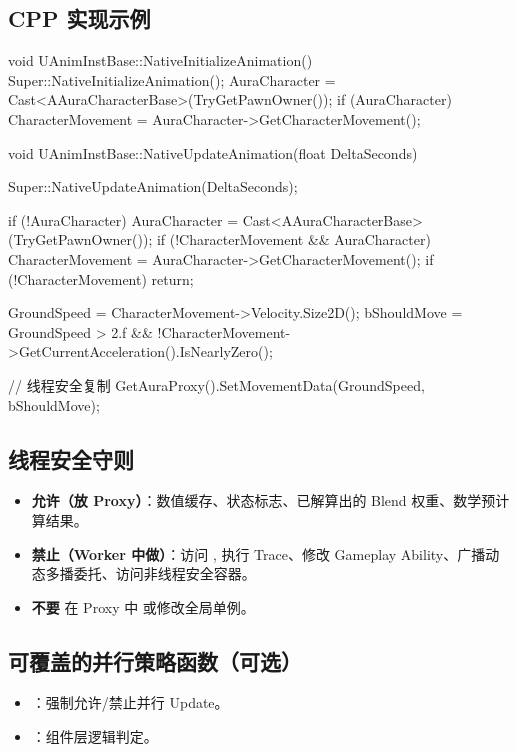 \documentclass[10pt,openright,oneside,CJKmath]{MyBook}
\begin{document}
\subsection*{CPP 实现示例}
\begin{code}[caption={AnimInstBase.cpp 示例}]
void UAnimInstBase::NativeInitializeAnimation()
{
    Super::NativeInitializeAnimation();
    AuraCharacter = Cast<AAuraCharacterBase>(TryGetPawnOwner());
    if (AuraCharacter)
    {
        CharacterMovement = AuraCharacter->GetCharacterMovement();
    }
}

void UAnimInstBase::NativeUpdateAnimation(float DeltaSeconds)
{
    Super::NativeUpdateAnimation(DeltaSeconds);

    if (!AuraCharacter)
        AuraCharacter = Cast<AAuraCharacterBase>(TryGetPawnOwner());
    if (!CharacterMovement && AuraCharacter)
        CharacterMovement = AuraCharacter->GetCharacterMovement();
    if (!CharacterMovement)
        return;

    GroundSpeed = CharacterMovement->Velocity.Size2D();
    bShouldMove = GroundSpeed > 2.f &&
                  !CharacterMovement->GetCurrentAcceleration().IsNearlyZero();

    // 线程安全复制
    GetAuraProxy().SetMovementData(GroundSpeed, bShouldMove);
}
\end{code}

\subsection{线程安全守则}
\begin{itemize}
  \item \textbf{允许（放 Proxy）}：数值缓存、状态标志、已解算出的 Blend 权重、数学预计算结果。
  \item \textbf{禁止（Worker 中做）}：访问 , 执行 Trace、修改 Gameplay Ability、广播动态多播委托、访问非线程安全容器。
  \item \textbf{不要} 在 Proxy 中  或修改全局单例。
\end{itemize}

\subsection{可覆盖的并行策略函数（可选）}
\begin{itemize}
  \item {}：强制允许/禁止并行 Update。
  \item {}：组件层逻辑判定。
\end{itemize}
\end{document}
